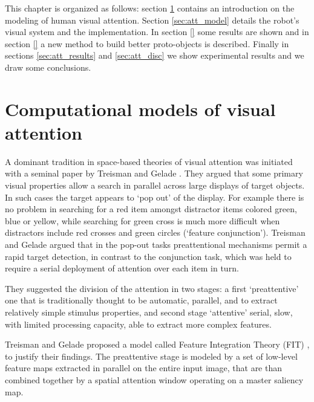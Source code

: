 \documentclass{llncs}
\begin{document}

This chapter is organized as follows:
section \ref{sec:att_comp_models} contains an introduction on the modeling of
human visual attention. Section \ref{sec:att_model}
details the robot's visual system and the
implementation. In section \ref{} some results are shown and
in section \ref{} a new method to build better proto-objects is described.
Finally in sections \ref{sec:att_results} and \ref{sec:att_disc} we show
experimental results and we draw some conclusions.


\section{Computational models of visual attention}
\label{sec:att_comp_models}

A dominant tradition in space-based theories of visual attention was initiated
with a seminal paper by Treisman and Gelade \cite{TreismanG80}. They argued
that some primary visual properties allow a search in parallel across large
displays of target objects. In such cases the target appears to `pop out' of
the display. For example there is no problem in searching for a red item
amongst distractor items colored green, blue or yellow, while searching for
green cross is much more difficult when distractors include red crosses and
green circles (`feature conjunction').
Treisman and Gelade argued that in the pop-out tasks preattentional mechanisms
permit a rapid target detection, in contrast to the conjunction task, which was held
to require a serial deployment of attention over each item in turn.

They suggested the division of the attention in two stages: a first `preattentive' one that is traditionally thought to be
automatic, parallel, and to extract relatively simple stimulus properties, and second stage
`attentive' serial, slow, with limited processing capacity, able to extract more complex features.

Treisman and Gelade proposed a model called Feature Integration Theory (FIT) \cite{TreismanG80},
to justify their findings. The preattentive stage is
modeled by a set of low-level feature maps extracted
in parallel on the entire input image, that are than combined
together by a spatial attention window operating on a
master saliency map.
\end{document}
